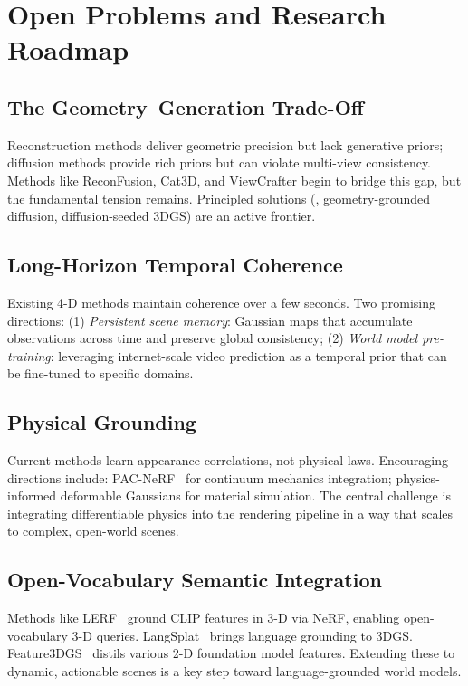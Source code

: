 \section{Open Problems and Research Roadmap}
\label{sec:open}

\subsection{The Geometry--Generation Trade-Off}

Reconstruction methods deliver geometric precision but lack generative priors;
diffusion methods provide rich priors but can violate multi-view consistency.
Methods like ReconFusion, Cat3D, and ViewCrafter begin to bridge this gap,
but the fundamental tension remains.
Principled solutions (\eg, geometry-grounded diffusion, diffusion-seeded 3DGS)
are an active frontier.

\subsection{Long-Horizon Temporal Coherence}

Existing 4-D methods maintain coherence over a few seconds.
Two promising directions:
(1) \emph{Persistent scene memory}: Gaussian maps that accumulate observations
across time and preserve global consistency;
(2) \emph{World model pre-training}: leveraging internet-scale video prediction
as a temporal prior that can be fine-tuned to specific domains.

\subsection{Physical Grounding}

Current methods learn appearance correlations, not physical laws.
Encouraging directions include:
PAC-NeRF~\citep{li2023pac} for continuum mechanics integration;
physics-informed deformable Gaussians for material simulation.
The central challenge is integrating differentiable physics into the rendering pipeline
in a way that scales to complex, open-world scenes.

\subsection{Open-Vocabulary Semantic Integration}

Methods like LERF~\citep{kerr2023lerf} ground CLIP features in 3-D via NeRF,
enabling open-vocabulary 3-D queries.
LangSplat~\citep{qin2024langsplat} brings language grounding to 3DGS.
Feature3DGS~\citep{zhou2024feature3dgs} distils various 2-D foundation model features.
Extending these to dynamic, actionable scenes is a key step toward language-grounded
world models.

